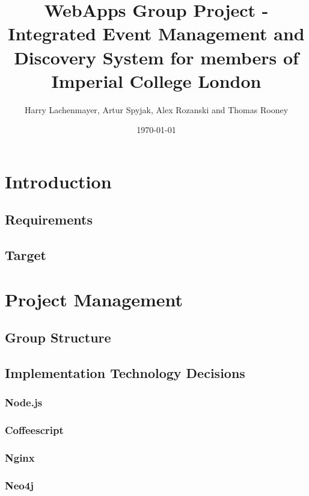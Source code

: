 \documentclass[a4wide, 11pt]{article}
\begin{document}
\title{WebApps Group Project - Integrated Event Management and Discovery System for members of Imperial College London}

\author{Harry Lachenmayer, Artur Spyjak, Alex Rozanski and Thomas Rooney}

\date{\today}         %

\maketitle            %

\section {Introduction}

\subsection {Requirements}
\subsection {Target}

\section {Project Management}

\subsection {Group Structure}

\subsection {Implementation Technology Decisions}
\subsubsection {Node.js}
\subsubsection {Coffeescript}
\subsubsection {Nginx}
\subsubsection {Neo4j}
\end{document}

